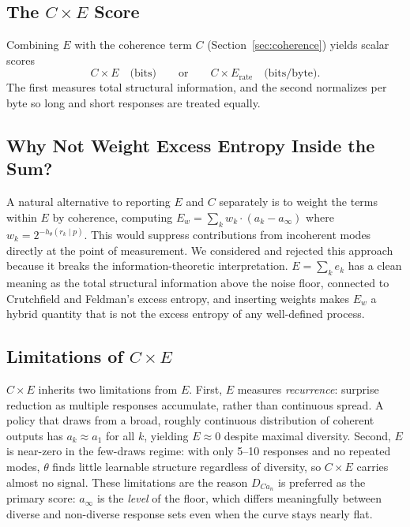 \subsection{The \texorpdfstring{$C \times E$}{C x E} Score}

Combining $E$ with the coherence term $C$ (Section~\ref{sec:coherence}) yields scalar scores
\begin{equation}\label{eq:D-total}
    C \times E \quad \text{(bits)} \qquad \text{or} \qquad C \times E_{\mathrm{rate}} \quad \text{(bits/byte)}.
\end{equation}
The first measures total structural information, and the second normalizes per byte so long and short responses are treated equally.

\subsection{Why Not Weight Excess Entropy Inside the Sum?}\label{app:why-not-weight}

A natural alternative to reporting $E$ and $C$ separately is to weight the terms within $E$ by coherence, computing $E_w = \sum_k w_k \cdot (a_k - a_\infty)$ where $w_k = 2^{-h_\theta(r_k \mid p)}$.
This would suppress contributions from incoherent modes directly at the point of measurement.
We considered and rejected this approach because it breaks the information-theoretic interpretation. $E = \sum_k e_k$ has a clean meaning as the total structural information above the noise floor, connected to Crutchfield and Feldman's excess entropy, and inserting weights makes $E_w$ a hybrid quantity that is not the excess entropy of any well-defined process.

\subsection{Limitations of $C \times E$}

$C \times E$ inherits two limitations from $E$.
First, $E$ measures \emph{recurrence}: surprise reduction as multiple responses accumulate, rather than continuous spread.
A policy that draws from a broad, roughly continuous distribution of coherent outputs has $a_k \approx a_1$ for all $k$, yielding $E \approx 0$ despite maximal diversity.
Second, $E$ is near-zero in the few-draws regime: with only 5--10 responses and no repeated modes, $\theta$ finds little learnable structure regardless of diversity, so $C \times E$ carries almost no signal.
These limitations are the reason $D_{Ca_n}$ is preferred as the primary score: $a_\infty$ is the \emph{level} of the floor, which differs meaningfully between diverse and non-diverse response sets even when the curve stays nearly flat.

